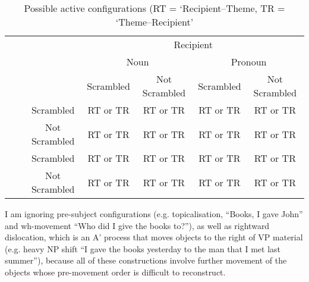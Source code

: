 \begin{table}[h!]
\begin{tabular}{ccccccc}
&&& \multicolumn{4}{c}{Recipient}\\
&&& \multicolumn{2}{c}{Noun} & \multicolumn{2}{c}{Pronoun}\\
&&& Scrambled & Not Scrambled & Scrambled & Not Scrambled\\
{\multirow{4}{*}{Theme}}&{\multirow{2}{*}{Noun}}&Scrambled&RT or TR&RT or TR&RT or TR&RT or TR\\
&&Not Scrambled&RT or TR&RT or TR&RT or TR&RT or TR\\
&{\multirow{2}{*}{Pronoun}}&Scrambled&RT or TR&RT or TR&RT or TR&RT or TR\\
&&Not Scrambled&RT or TR&RT or TR&RT or TR&RT or TR\\
\end{tabular}
\caption{Possible active configurations (RT = `Recipient--Theme, TR = `Theme--Recipient'}
\label{tab:activeorders}
\end{table}

 I am ignoring pre-subject configurations (e.g. topicalisation, ``Books, I gave John'' and wh-movement ``Who did I give the books to?''), as well as rightward dislocation, which is an A' process that moves objects to the right of VP material (e.g. heavy NP shift ``I gave the books yesterday to the man that I met last summer''), because all of these constructions involve further movement of the objects whose pre-movement order is difficult to reconstruct.


